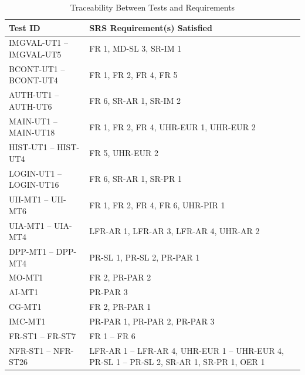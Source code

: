 \documentclass[12pt, titlepage]{article}
\begin{document}
\begin{table}[H]
  \centering
  \caption{Traceability Between Tests and Requirements}
  \label{table:test-requirement-trace}
  \small
  \begin{tabularx}{0.96\textwidth}{|>{\centering\arraybackslash}p{}|X|}
    \hline
    \textbf{Test ID} & \textbf{SRS Requirement(s) Satisfied} \\ \hline

    IMGVAL-UT1 -- IMGVAL-UT5 & FR 1, MD-SL 3, SR-IM 1 \\ \hline

    BCONT-UT1 -- BCONT-UT4 & FR 1, FR 2, FR 4, FR 5 \\ \hline

    AUTH-UT1 -- AUTH-UT6 & FR 6, SR-AR 1, SR-IM 2 \\ \hline

    MAIN-UT1 -- MAIN-UT18 & FR 1, FR 2, FR 4, UHR-EUR 1, UHR-EUR 2 \\ \hline

    HIST-UT1 -- HIST-UT4 & FR 5, UHR-EUR 2 \\ \hline

    LOGIN-UT1 -- LOGIN-UT16 & FR 6, SR-AR 1, SR-PR 1 \\ \hline

    UII-MT1 -- UII-MT6 & FR 1, FR 2, FR 4, FR 6, UHR-PIR 1 \\ \hline

    UIA-MT1 -- UIA-MT4 & LFR-AR 1, LFR-AR 3, LFR-AR 4, UHR-AR 2 \\ \hline

    DPP-MT1 -- DPP-MT4 & PR-SL 1, PR-SL 2, PR-PAR 1 \\ \hline

    MO-MT1 & FR 2, PR-PAR 2 \\ \hline

    AI-MT1 & PR-PAR 3 \\ \hline

    CG-MT1 & FR 2, PR-PAR 1 \\ \hline

    IMC-MT1 & PR-PAR 1, PR-PAR 2, PR-PAR 3 \\ \hline

    FR-ST1 -- FR-ST7 & FR 1 -- FR 6 \\ \hline

    NFR-ST1 -- NFR-ST26 & LFR-AR 1 -- LFR-AR 4, UHR-EUR 1 -- UHR-EUR 4, PR-SL 1 -- PR-SL 2, SR-AR 1, SR-PR 1, OER 1 \\ \hline

  \end{tabularx}
\end{table}
\end{document}
